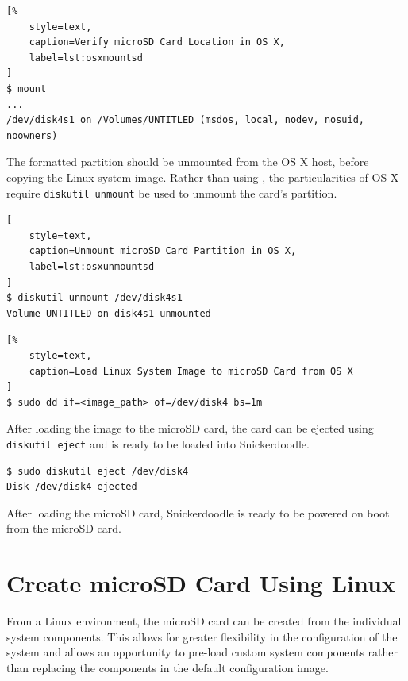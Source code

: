 \begin{lstlisting}[%
	style=text,
	caption=Verify microSD Card Location in OS X,
	label=lst:osxmountsd
]
$ mount
...
/dev/disk4s1 on /Volumes/UNTITLED (msdos, local, nodev, nosuid, noowners)
\end{lstlisting}


The formatted partition should be unmounted from the OS X host, before copying the Linux system image. Rather than using , the particularities of OS X require \texttt{diskutil unmount} be used to unmount the card's partition. 


\begin{lstlisting}[
	style=text,
	caption=Unmount microSD Card Partition in OS X,
	label=lst:osxunmountsd
]
$ diskutil unmount /dev/disk4s1
Volume UNTITLED on disk4s1 unmounted
\end{lstlisting}




\begin{lstlisting}[%
	style=text,
	caption=Load Linux System Image to microSD Card from OS X
]
$ sudo dd if=<image_path> of=/dev/disk4 bs=1m
\end{lstlisting}


After loading the image to the microSD card, the card can be ejected using \texttt{diskutil eject} and is ready to be loaded into Snickerdoodle.


\begin{lstlisting}	
$ sudo diskutil eject /dev/disk4
Disk /dev/disk4 ejected
\end{lstlisting}


After loading the microSD card, Snickerdoodle is ready to be powered on boot from the microSD card. %


\section{Create microSD Card Using Linux}

From a Linux environment, the microSD card can be created from the individual system components. This allows for greater flexibility in the configuration of the system and allows an opportunity to pre-load custom system components rather than replacing the components in the default configuration image.


